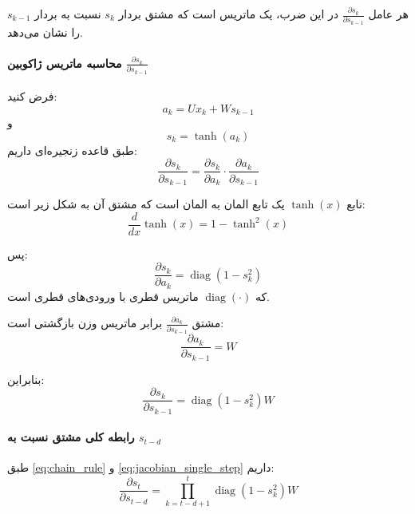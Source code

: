 \documentclass{article}
\begin{document}
هر عامل \(\frac{\partial s_k}{\partial s_{k-1}}\) در این ضرب، یک ماتریس  است که مشتق بردار \(s_k\) نسبت به بردار \(s_{k-1}\) را نشان می‌دهد.

\medskip

\paragraph{محاسبه ماتریس ژاکوبین \(\frac{\partial s_k}{\partial s_{k-1}}\)}

فرض کنید:
\begin{equation}
a_k = U x_k + W s_{k-1}
\end{equation}
و
\begin{equation}
s_k = \tanh(a_k)
\end{equation}
طبق قاعده زنجیره‌ای داریم:
\begin{equation}
	\frac{\partial s_k}{\partial s_{k-1}} = \frac{\partial s_k}{\partial a_k} \cdot \frac{\partial a_k}{\partial s_{k-1}}
\end{equation}

تابع \(\tanh(x)\) یک تابع المان به المان است که مشتق آن به شکل زیر است:
\begin{equation}
\frac{d}{dx} \tanh(x) = 1 - \tanh^2(x)
\end{equation}

پس:
\begin{equation}
	\frac{\partial s_k}{\partial a_k} = \operatorname{diag}\left(1 - s_k^2\right)
	\label{eq:jacobian_diag}
\end{equation}
که \(\operatorname{diag}(\cdot)\) ماتریس قطری با ورودی‌های قطری است.

مشتق \(\frac{\partial a_k}{\partial s_{k-1}}\) برابر ماتریس وزن بازگشتی است:
\begin{equation}
\frac{\partial a_k}{\partial s_{k-1}} = W
\end{equation}

بنابراین:
\begin{equation}
	\frac{\partial s_k}{\partial s_{k-1}} = \operatorname{diag}\left(1 - s_k^2\right) W
	\label{eq:jacobian_single_step}
\end{equation}

\medskip

\paragraph{رابطه کلی مشتق نسبت به \(s_{t-d}\)}

طبق \eqref{eq:chain_rule} و \eqref{eq:jacobian_single_step} داریم:
\begin{equation}
	\frac{\partial s_t}{\partial s_{t-d}} = \prod_{k=t-d+1}^t \operatorname{diag}\left(1 - s_k^2\right) W
	\label{eq:jacobian_product}
\end{equation}
\end{document}
